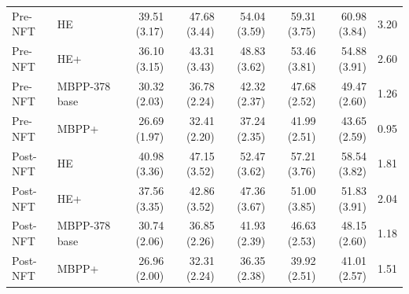\documentclass[11pt,letterpaper]{article}
\begin{document}
\begin{table}[htbp]
\begin{tabular}{@{}llrrrrrr@{}}
Pre-NFT & HE & 39.51 {\scriptsize (3.17)} & 47.68 {\scriptsize (3.44)} & 54.04 {\scriptsize (3.59)} & 59.31 {\scriptsize (3.75)} & 60.98 {\scriptsize (3.84)} & 3.20\\
Pre-NFT & HE+ & 36.10 {\scriptsize (3.15)} & 43.31 {\scriptsize (3.43)} & 48.83 {\scriptsize (3.62)} & 53.46 {\scriptsize (3.81)} & 54.88 {\scriptsize (3.91)} & 2.60\\
Pre-NFT & MBPP-378 base & 30.32 {\scriptsize (2.03)} & 36.78 {\scriptsize (2.24)} & 42.32 {\scriptsize (2.37)} & 47.68 {\scriptsize (2.52)} & 49.47 {\scriptsize (2.60)} & 1.26\\
Pre-NFT & MBPP+ & 26.69 {\scriptsize (1.97)} & 32.41 {\scriptsize (2.20)} & 37.24 {\scriptsize (2.35)} & 41.99 {\scriptsize (2.51)} & 43.65 {\scriptsize (2.59)} & 0.95\\
Post-NFT & HE & 40.98 {\scriptsize (3.36)} & 47.15 {\scriptsize (3.52)} & 52.47 {\scriptsize (3.62)} & 57.21 {\scriptsize (3.76)} & 58.54 {\scriptsize (3.82)} & 1.81\\
Post-NFT & HE+ & 37.56 {\scriptsize (3.35)} & 42.86 {\scriptsize (3.52)} & 47.36 {\scriptsize (3.67)} & 51.00 {\scriptsize (3.85)} & 51.83 {\scriptsize (3.91)} & 2.04\\
Post-NFT & MBPP-378 base & 30.74 {\scriptsize (2.06)} & 36.85 {\scriptsize (2.26)} & 41.93 {\scriptsize (2.39)} & 46.63 {\scriptsize (2.53)} & 48.15 {\scriptsize (2.60)} & 1.18\\
Post-NFT & MBPP+ & 26.96 {\scriptsize (2.00)} & 32.31 {\scriptsize (2.24)} & 36.35 {\scriptsize (2.38)} & 39.92 {\scriptsize (2.51)} & 41.01 {\scriptsize (2.57)} & 1.51\\
\bottomrule
\end{tabular}
\end{table}
\end{document}
